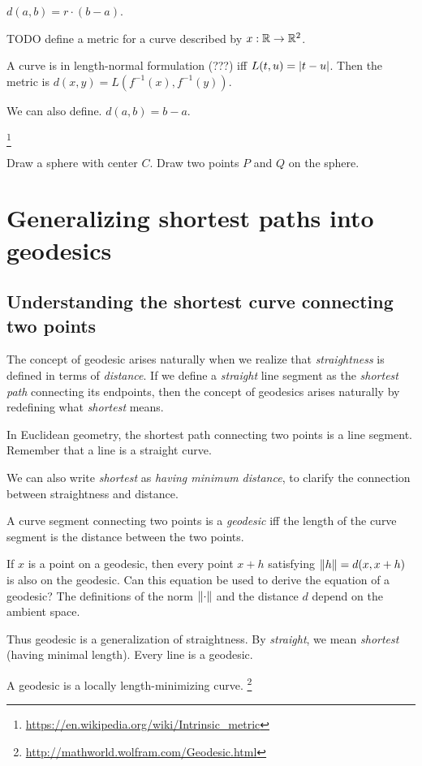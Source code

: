 \(d(a,b) = r \cdot (b-a)\).

TODO define a metric for a curve described by \(x : \mathbb{R} \to \mathbb{R}^2\).

A curve is in length-normal formulation (???)
iff \( L(t,u) = \abs{t-u} \).
Then the metric is \(d(x,y) = L(f^{-1}(x), f^{-1}(y))\).

We can also define.
\(d(a,b) = b-a\).

\footnote{\url{https://en.wikipedia.org/wiki/Intrinsic_metric}}

Draw a sphere with center \(C\).
Draw two points \(P\) and \(Q\) on the sphere.

\section{Generalizing shortest paths into geodesics}

\subsection{Understanding the shortest curve connecting two points}

The concept of geodesic arises naturally when we realize
that \emph{straightness} is defined in terms of \emph{distance}.
If we define a \emph{straight} line segment as the \emph{shortest path} connecting its endpoints,
then the concept of geodesics arises naturally by redefining what \emph{shortest} means.

In Euclidean geometry, the shortest path connecting two points is a line segment.
Remember that a line is a straight curve.

We can also write \emph{shortest} as \emph{having minimum distance},
to clarify the connection between straightness and distance.

A curve segment connecting two points is a \emph{geodesic}
iff the length of the curve segment is the distance between the two points.

If \(x\) is a point on a geodesic,
then every point \(x + h\) satisfying \(\norm{h} = d(x,x+h)\) is also on the geodesic.
Can this equation be used to derive the equation of a geodesic?
The definitions of the norm \(\norm{\cdot}\) and the distance \(d\) depend on the ambient space.

Thus geodesic is a generalization of straightness.
By \emph{straight}, we mean \emph{shortest} (having minimal length).
Every line is a geodesic.

A geodesic is a locally length-minimizing curve.%
\footnote{\url{http://mathworld.wolfram.com/Geodesic.html}}

